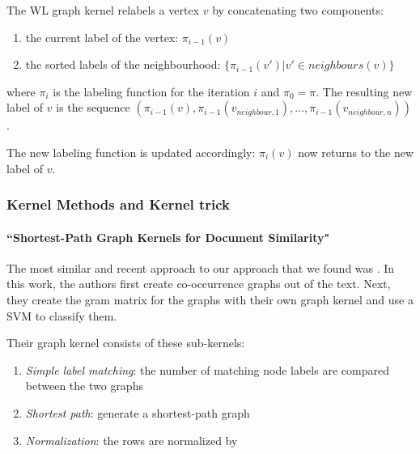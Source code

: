 The WL graph kernel relabels a vertex $v$ by concatenating two components:
\begin{enumerate}
    \item{the current label of the vertex: $\pi_{i-1}(v)$}
    \item{the sorted labels of the neighbourhood: $\{ \pi_{i-1}(v') | v' \in neighbours(v) \}$}
\end{enumerate}
where $\pi_{i}$ is the labeling function for the iteration $i$ and $\pi_0 = \pi$.
The resulting new label of $v$ is the sequence $(\pi_{i-1}(v), \pi_{i-1}(v_{neighbour,1}), \dots , \pi_{i-1}(v_{neighbour,n}))$.


The new labeling function is updated accordingly: $\pi_i(v)$ now returns to the new label of $v$.


\subsubsection{Kernel Methods and Kernel trick}


\paragraph{``Shortest-Path Graph Kernels for Document Similarity" \cite{Nikolentzos2017a}}
The most similar and recent approach to our approach that we found was \cite{Nikolentzos2017a}. In this work, the authors first create co-occurrence graphs out of the text. Next, they create the gram matrix for the graphs with their own graph kernel and use a SVM to classify them.

Their graph kernel consists of these sub-kernels:
\begin{enumerate}
\item{\textit{Simple label matching}: the number of matching node labels are compared between the two graphs}
\item{\textit{Shortest path}: generate a shortest-path graph}
\item{\textit{Normalization}: the rows are normalized by }
\end{enumerate}

